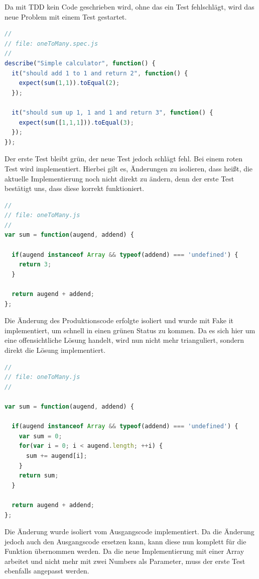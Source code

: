 Da mit TDD kein Code geschrieben wird, ohne das ein Test fehlschlägt, wird das neue Problem mit einem Test gestartet.

\begin{lstlisting}[language=JavaScript]
//
// file: oneToMany.spec.js
//
describe("Simple calculator", function() {
  it("should add 1 to 1 and return 2", function() {
    expect(sum(1,1)).toEqual(2);
  });

  it("should sum up 1, 1 and 1 and return 3", function() {
    expect(sum([1,1,1])).toEqual(3);
  });
});

\end{lstlisting}

Der erste Test bleibt grün, der neue Test jedoch schlägt fehl. Bei einem roten Test wird implementiert. Hierbei gilt es, Änderungen zu isolieren, dass heißt, die aktuelle Implementierung noch nicht direkt zu ändern, denn der erste Test bestätigt uns, dass diese korrekt funktioniert.

\begin{lstlisting}[language=JavaScript]
//
// file: oneToMany.js
//
var sum = function(augend, addend) {

  if(augend instanceof Array && typeof(addend) === 'undefined') {
    return 3;
  }

  return augend + addend;
};
\end{lstlisting}

Die Änderung des Produktionscode erfolgte isoliert und wurde mit Fake it implementiert, um schnell in einen grünen Status zu kommen. Da es sich hier um eine offensichtliche Lösung handelt, wird nun nicht mehr trianguliert, sondern direkt die Lösung implementiert.

\begin{lstlisting}[language=JavaScript]
//
// file: oneToMany.js
//

var sum = function(augend, addend) {

  if(augend instanceof Array && typeof(addend) === 'undefined') {
    var sum = 0;
    for(var i = 0; i < augend.length; ++i) {
      sum += augend[i];
    }
    return sum;
  }

  return augend + addend;
};
\end{lstlisting}

Die Änderung wurde isoliert vom Ausgangscode implementiert. Da die Änderung jedoch auch den Ausgangscode ersetzen kann, kann diese nun komplett für die Funktion  übernommen werden. Da die neue Implementierung mit einer Array arbeitet und nicht mehr mit zwei Numbers als Parameter, muss der erste Test ebenfalls angepasst werden.


